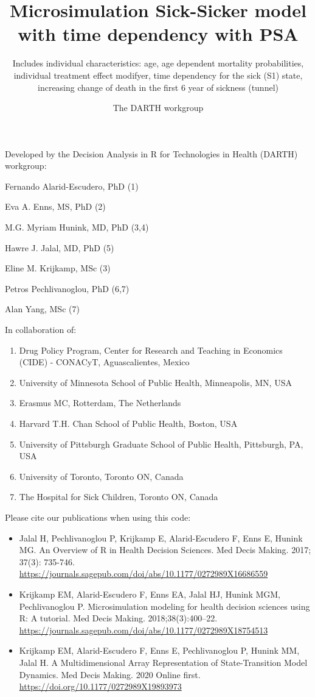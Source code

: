 \documentclass[
]{article}
\title{Microsimulation Sick-Sicker model with time dependency with PSA}
\subtitle{Includes individual characteristics: age, age dependent mortality
probabilities, individual treatment effect modifyer, time dependency for
the sick (S1) state, increasing change of death in the first 6 year of
sickness (tunnel)}
\author{The DARTH workgroup}
\date{}
\providecommand{\tightlist}{%
  \setlength{\itemsep}{0pt}\setlength{\parskip}{0pt}}
\begin{document}
\maketitle

Developed by the Decision Analysis in R for Technologies in Health
(DARTH) workgroup:

Fernando Alarid-Escudero, PhD (1)

Eva A. Enns, MS, PhD (2)

M.G. Myriam Hunink, MD, PhD (3,4)

Hawre J. Jalal, MD, PhD (5)

Eline M. Krijkamp, MSc (3)

Petros Pechlivanoglou, PhD (6,7)

Alan Yang, MSc (7)

In collaboration of:

\begin{enumerate}
\def\labelenumi{\arabic{enumi}.}
\tightlist
\item
  Drug Policy Program, Center for Research and Teaching in Economics
  (CIDE) - CONACyT, Aguascalientes, Mexico
\item
  University of Minnesota School of Public Health, Minneapolis, MN, USA
\item
  Erasmus MC, Rotterdam, The Netherlands
\item
  Harvard T.H. Chan School of Public Health, Boston, USA
\item
  University of Pittsburgh Graduate School of Public Health, Pittsburgh,
  PA, USA
\item
  University of Toronto, Toronto ON, Canada
\item
  The Hospital for Sick Children, Toronto ON, Canada
\end{enumerate}

Please cite our publications when using this code:

\begin{itemize}
\item
  Jalal H, Pechlivanoglou P, Krijkamp E, Alarid-Escudero F, Enns E,
  Hunink MG. An Overview of R in Health Decision Sciences. Med Decis
  Making. 2017; 37(3): 735-746.
  \url{https://journals.sagepub.com/doi/abs/10.1177/0272989X16686559}
\item
  Krijkamp EM, Alarid-Escudero F, Enns EA, Jalal HJ, Hunink MGM,
  Pechlivanoglou P. Microsimulation modeling for health decision
  sciences using R: A tutorial. Med Decis Making. 2018;38(3):400--22.
  \url{https://journals.sagepub.com/doi/abs/10.1177/0272989X18754513}
\item
  Krijkamp EM, Alarid-Escudero F, Enns E, Pechlivanoglou P, Hunink MM,
  Jalal H. A Multidimensional Array Representation of State-Transition
  Model Dynamics. Med Decis Making. 2020 Online first.
  \url{https://doi.org/10.1177/0272989X19893973}
\end{itemize}
\end{document}
